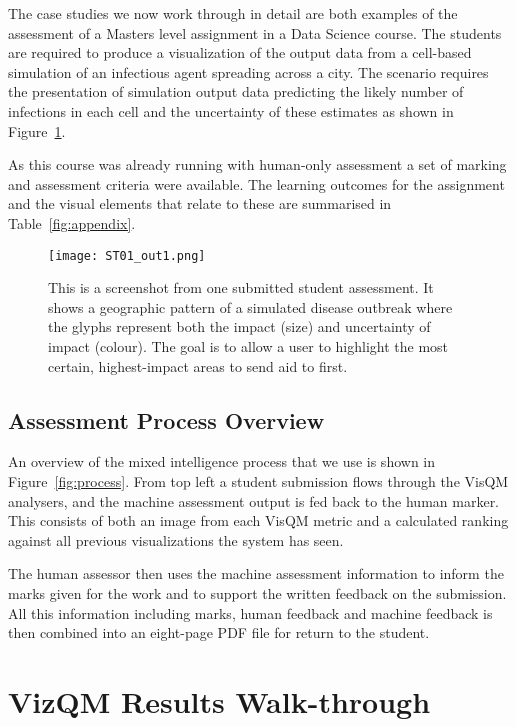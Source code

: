 The case studies we now work through in detail are both examples of the assessment of a Masters level assignment in a Data Science course. The students are required to produce a visualization of the output data from a cell-based simulation of an infectious agent spreading across a city. The scenario requires the presentation of simulation output data predicting the likely number of infections in each cell and the uncertainty of these estimates as shown in Figure~\ref{fig:output01}.

As this course was already running with human-only assessment a set of marking and assessment criteria were available.
The learning outcomes for the assignment and the visual elements that relate to these are summarised in Table~\ref{fig:appendix}.



\begin{figure}[htb]
  \centering
  \texttt{[image: ST01\_out1.png]}

  \caption{\label{fig:output01}
           This is a screenshot from one submitted student assessment. It shows a geographic pattern of a simulated disease outbreak where the glyphs represent both the impact (size) and uncertainty of impact (colour). The goal is to allow a user to highlight the most certain, highest-impact areas to send aid to first.}
\end{figure}


\subsection{Assessment Process Overview}

An overview of the mixed intelligence process that we use is shown in Figure~\ref{fig:process}. From top left a student submission flows through the VisQM analysers, and the machine assessment output is fed back to the human marker. This consists of both an image from each VisQM metric and a calculated ranking against all previous visualizations the system has seen. 

The human assessor then uses the machine assessment information to inform the marks given for the work and to support the written feedback on the submission. All this information including marks, human feedback and machine feedback is then combined into an eight-page PDF file for return to the student. 

\section{VizQM Results Walk-through}

